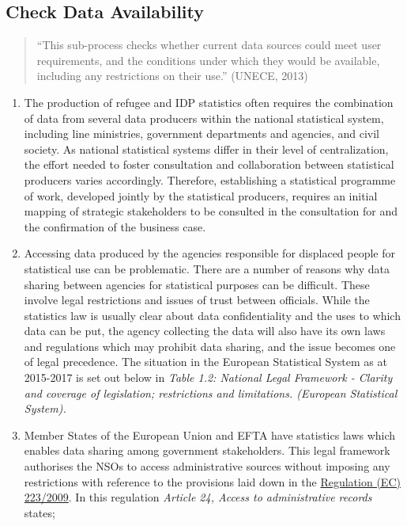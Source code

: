 \documentclass[
]{article}
\begin{document}
\hypertarget{check-data-availability-1}{%
\subsection{Check Data Availability}\label{check-data-availability-1}}

\begin{quote}
``This sub-process checks whether current data sources could meet user
requirements, and the conditions under which they would be available,
including any restrictions on their use.'' (UNECE, 2013)
\end{quote}

\begin{enumerate}
\def\labelenumi{\arabic{enumi}.}
\setcounter{enumi}{52}
\item
  The production of refugee and IDP statistics often requires the
  combination of data from several data producers within the national
  statistical system, including line ministries, government
  departments and agencies, and civil society. As national statistical
  systems differ in their level of centralization, the effort needed
  to foster consultation and collaboration between statistical
  producers varies accordingly. Therefore, establishing a statistical
  programme of work, developed jointly by the statistical producers,
  requires an initial mapping of strategic stakeholders to be
  consulted in the consultation for and the confirmation of the
  business case.
\item
  Accessing data produced by the agencies responsible for displaced
  people for statistical use can be problematic. There are a number of
  reasons why data sharing between agencies for statistical purposes
  can be difficult. These involve legal restrictions and issues of
  trust between officials. While the statistics law is usually clear
  about data confidentiality and the uses to which data can be put,
  the agency collecting the data will also have its own laws and
  regulations which may prohibit data sharing, and the issue becomes
  one of legal precedence. The situation in the European Statistical
  System as at 2015-2017 is set out below in \emph{Table 1.2: National
  Legal Framework - Clarity and coverage of legislation; restrictions
  and limitations. (European Statistical System).}
\item
  Member States of the European Union and EFTA have statistics laws
  which enables data sharing among government stakeholders. This legal
  framework authorises the NSOs to access administrative sources
  without imposing any restrictions with reference to the provisions
  laid down in the \href{https://eur-lex.europa.eu/LexUriServ/LexUriServ.do?uri=OJ:L:2009:087:0164:0173:En:PDF}{Regulation (EC)
  223/2009}.
  In this regulation \emph{Article 24, Access to administrative records}
  states;


\end{enumerate}
\end{document}
